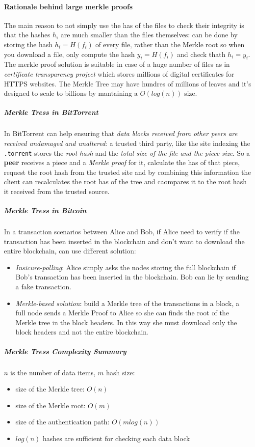 \documentclass[10pt,a4paper]{report}
\begin{document}
\paragraph{Rationale behind large merkle proofs}\label{sec:rationale-behind-large-merkle-proofs}
The main reason to not simply use the has of the files to check their integrity is that the hashes $h_{i}$ are much smaller than the files themselves: can be done by storing the hash $h_{i} = H(f_{i})$ of every file, rather than the Merkle root so when you download a file, only compute the hash $y_{i}=H(f_{i})$ and check thath $h_{i} = y_{i}$.
The merkle proof solution is suitable in case of a huge number of files as in \textit{certificate transparency project} which stores millions of digital certificates for HTTPS websites. The Merkle Tree may have hundres of millions of leaves and it's designed to scale to billions by mantaining a $O(log(n))$ size.
\subparagraph{Merkle Tress in BitTorrent}\label{sec:merkle-tress-in-bittorrent}
In BitTorrent can help ensuring that \textit{data blocks received from other peers are received undamaged and unaltered}: a trusted third party, like the site indexing the \texttt{.torrent} stores the \textit{root hash} and the \textit{total size of the file and the piece size}. So a \textbf{peer} receives a piece and a \textit{Merkle proof} for it, calculate the has of that piece, request the root hash from the trusted site and by combining this information the client can recalculates the root has of the tree and caompares it to the root hash it received from the trusted source.
\subparagraph{Merkle Tress in Bitcoin}\label{sec:merkle-tress-in-bitcoin}
In a transaction scenarios between Alice and Bob, if Alice need to verify if the transaction has been inserted in the blockchain and don't want to download the entire blockchain, can use different solution:
\begin{itemize}
	\item 
	\textit{Insicure-polling}: Alice simply asks the nodes storing the full blockchain if Bob's transaction has been inserted in the blockchain. Bob can lie by sending a fake transaction.
	\item 
	\textit{Merkle-based solution}: build a Merkle tree of the transactions in a block, a full node sends a Merkle Proof to Alice so she can finds the root of the Merkle tree in the block headers. In this way she must download only the block headers and not the entire blockchain.
\end{itemize}
\subparagraph{Merkle Tress Complexity Summary}\label{sec:merkle-tress-complexity-summary}
$n$ is the number of data items, $m$ hash size:
\begin{itemize}
	\item 
	size of the Merkle tree: $O(n)$
	\item 
	size of the Merkle root: $O(m)$
	\item 
	size of the authentication path: $O(m log(n))$
	\item 
	$log(n)$ hashes are sufficient for checking each data block
\end{itemize}
\end{document}
